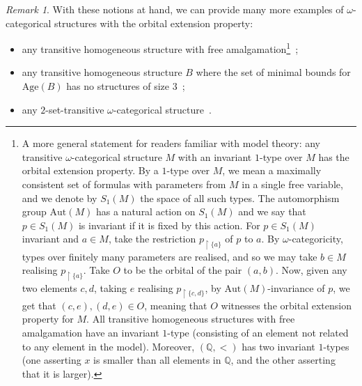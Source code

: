 \documentclass{article}
\theoremstyle{remark}
\newtheorem{remark}[theorem]{Remark}
\theoremstyle{definition}
\begin{document}
\begin{remark}\label{rem:examples:oep} With these notions at hand, we can provide many more examples of $\omega$-categorical structures with the  orbital extension property:
\begin{itemize}
   \item any transitive homogeneous structure with free amalgamation\footnote{A more general statement for readers familiar with model theory: any transitive $\omega$-categorical structure $M$ with an invariant $1$-type over $M$ has the orbital extension property. By a $1$-type over $M$, we mean a maximally consistent set of formulas with parameters from $M$ in a single free variable, and we denote by $S_1(M)$ the space of all such types. The automorphism group $\mathrm{Aut}(M)$ has a natural action on $S_1(M)$ and we say that $p\in S_1(M)$ is invariant if it is fixed by this action. For $p\in S_1(M)$ invariant and $a\in M$, take the restriction $p_{\upharpoonright\{a\}}$ of $p$ to $a$. By $\omega$-categoricity, types over finitely many parameters are realised, and so we may take $b\in M$ realising $p_{\upharpoonright\{a\}}$. Take $O$ to be the orbital of the pair $(a,b)$. Now, given any two elements $c,d$, taking $e$ realising $p_{\upharpoonright\{c,d\}}$, by $\mathrm{Aut}(M)$-invariance of $p$, we get that $(c,e), (d,e)\in O$, meaning that $O$ witnesses the orbital extension property for $M$. All transitive homogeneous structures with free amalgamation have an invariant $1$-type (consisting of an element not related to any element in the model). Moreover, $(\mathbb{Q}, <)$ has two invariant $1$-types (one asserting $x$ is smaller than all elements in $\mathbb{Q}$, and the other asserting that it is larger).}~\cite[Example 20]{Smoothapp};
   \item any transitive homogeneous structure $B$ where the set of minimal bounds for $\mathrm{Age}(B)$ has no structures of size $3$~\cite[Example 20]{Smoothapp};
   \item any $2$-set-transitive $\omega$-categorical structure~\cite[Lemma 3.7]{bodirsky2020complexity}.
\end{itemize}
\end{remark}


\end{document}
